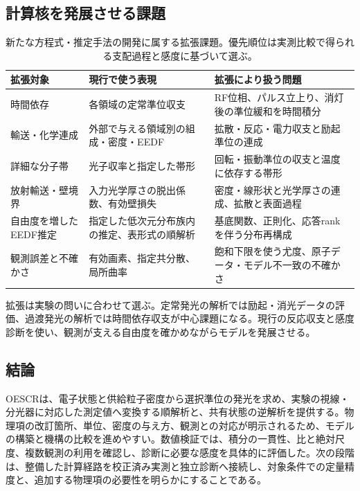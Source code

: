 \subsection{計算核を発展させる課題}
\begin{table}[htbp]
\centering\small
\begin{tabularx}{\linewidth}{p{28mm}YY}
\toprule
拡張対象 & 現行で使う表現 & 拡張により扱う問題 \\
\midrule
時間依存 & 各領域の定常準位収支 & RF位相、パルス立上り、消灯後の準位緩和を時間積分 \\
輸送・化学連成 & 外部で与える領域別の組成・密度・EEDF & 拡散・反応・電力収支と励起準位の連成 \\
詳細な分子帯 & 光子収率と指定した帯形 & 回転・振動準位の収支と温度に依存する帯形 \\
放射輸送・壁境界 & 入力光学厚さの脱出係数、有効壁損失 & 密度・線形状と光学厚さの連成、拡散と表面過程 \\
自由度を増したEEDF推定 & 指定した低次元分布族内の推定、表形式の順解析 & 基底関数、正則化、応答rankを伴う分布再構成 \\
観測誤差と不確かさ & 有効画素、指定共分散、局所曲率 & 飽和下限を使う尤度、原子データ・モデル不一致の不確かさ \\
\bottomrule
\end{tabularx}
\caption{新たな方程式・推定手法の開発に属する拡張課題。優先順位は実測比較で得られる支配過程と感度に基づいて選ぶ。}
\label{tab:future}
\end{table}

拡張は実験の問いに合わせて選ぶ。定常発光の解析では励起・消光データの評価、過渡発光の解析では時間依存収支が中心課題になる。現行の反応収支と感度診断を使い、観測が支える自由度を確かめながらモデルを発展させる。

\subsection{結論}
OESCRは、電子状態と供給粒子密度から選択準位の発光を求め、実験の視線・分光器に対応した測定値へ変換する順解析と、共有状態の逆解析を提供する。物理項の改訂箇所、単位、密度の与え方、観測との対応が明示されるため、モデルの構築と機構の比較を進めやすい。数値検証では、積分の一貫性、比と絶対尺度、複数観測の利用を確認し、診断に必要な感度を具体的に評価した。次の段階は、整備した計算経路を校正済み実測と独立診断へ接続し、対象条件での定量精度と、追加する物理項の必要性を明らかにすることである。
